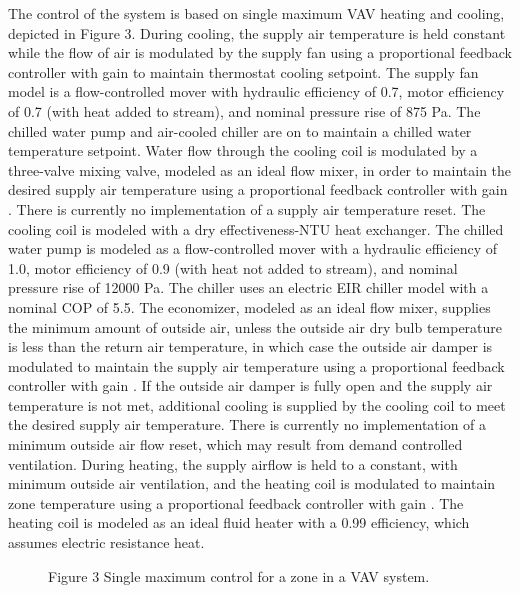 \documentclass[letterpaper,10pt,english]{sphinxmanual}
\begin{document}
The control of the system is based on single maximum VAV heating and cooling, depicted in Figure 3.  During cooling, the supply air temperature is held constant while the flow of air is modulated by the supply fan using a proportional feedback controller with gain  to maintain thermostat cooling setpoint.  The supply fan model is a flow-controlled mover with hydraulic efficiency of 0.7, motor efficiency of 0.7 (with heat added to stream), and nominal pressure rise of 875 Pa.  The chilled water pump and air-cooled chiller are on to maintain a chilled water temperature setpoint.  Water flow through the cooling coil is modulated by a three-valve mixing valve, modeled as an ideal flow mixer, in order to maintain the desired supply air temperature using a proportional feedback controller with gain .  There is currently no implementation of a supply air temperature reset.  The cooling coil is modeled with a dry effectiveness-NTU heat exchanger.  The chilled water pump is modeled as a flow-controlled mover with a hydraulic efficiency of 1.0, motor efficiency of 0.9 (with heat not added to stream), and nominal pressure rise of 12000 Pa.  The chiller uses an electric EIR chiller model with a nominal COP of 5.5.  The economizer, modeled as an ideal flow mixer, supplies the minimum amount of outside air, unless the outside air dry bulb temperature is less than the return air temperature, in which case the outside air damper is modulated to maintain the supply air temperature using a proportional feedback controller with gain .  If the outside air damper is fully open and the supply air temperature is not met, additional cooling is supplied by the cooling coil to meet the desired supply air temperature.  There is currently no implementation of a minimum outside air flow reset, which may result from demand controlled ventilation.  During heating, the supply airflow is held to a constant, with minimum outside air ventilation, and the heating coil is modulated to maintain zone temperature using a proportional feedback controller with gain .  The heating coil is modeled as an ideal fluid heater with a 0.99 efficiency, which assumes electric resistance heat.

\begin{figure}[htbp]
\centering
\capstart

\noindent{}
\caption{Figure 3 \textendash{} Single maximum control for a zone in a VAV system.}\label{\detokenize{modelDescription:id3}}\end{figure}
\end{document}
